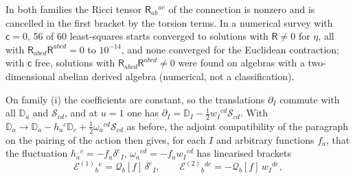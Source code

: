 In both families the Ricci tensor \(\mathsf R_{ab}{}^{ae}\) of the connection is nonzero and is cancelled in the first bracket by the torsion terms. In a numerical survey with \(\mathsf c=0\), 56 of 60 least-squares starts converged to solutions with \(\mathsf R\neq0\) for \(\eta\), all with \(\mathsf R_{abcd}\mathsf R^{abcd}=0\) to \(10^{-14}\), and none converged for the Euclidean contraction; with \(\mathsf c\) free, solutions with \(\mathsf R_{abcd}\mathsf R^{abcd}\neq0\) were found on algebras with a two-dimensional abelian derived algebra (numerical, not a classification).

On family (i) the coefficients are constant, so the translations \(\partial_I\) commute with all \(\mathbb D_a\) and \(\mathcal S_{cd}\), and at \(u=1\) one has \(\partial_I=\mathbb D_I-\tfrac12w_I{}^{cd}\mathcal S_{cd}\). With \(\mathbb D_a\to\mathbb D_a-h_a{}^c\mathbb D_c+\tfrac12\omega_a{}^{cd}\mathcal S_{cd}\) as before, the adjoint compatibility of the paragraph on the pairing of the action then gives, for each \(I\) and arbitrary functions \(f_a\), that the fluctuation \(h_a{}^c=-f_a\delta^c{}_I\), \(\omega_a{}^{cd}=-f_aw_I{}^{cd}\) has linearised brackets
\[
\mathcal E^{(1)}{}_b{}^e=\mathcal Q_b[f]\,\delta^e{}_I,\qquad
\mathcal E^{(2)}{}_b{}^{de}=-\mathcal Q_b[f]\,w_I{}^{de},
\]
